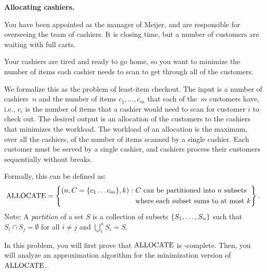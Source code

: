 \documentclass[11pt,addpoints,answers]{exam}
\begin{document}
\begin{questions}
\pagebreak
  \question \textbf{Allocating cashiers.} 

    You have been appointed as the manager of Meijer, and are responsible for overseeing the team of cashiers. It is closing time, but a number of customers are waiting with full carts. 

    Your cashiers are tired and ready to go home, so you want to minimize the number of items each cashier needs to scan to get through all of the customers. 
    
    We formalize this as the problem of least-item checkout.
    The input is a number of cashiers~$n$ and the number of items $c_{1}, \ldots, c_{m}$ that each of the~$m$ customers have, i.e., $c_{i}$ is the number of items that a cashier would need to scan for customer $i$ to check out.
    The desired output is an allocation of the customers to the cashiers that minimizes the workload.
    The workload of an allocation is the maximum, over all the cashiers, of the number of items scanned by a single cashier.
    Each customer must be served by a single cashier, and cashiers process their customers sequentially without breaks.
    
\newcommand{\Allocate}{\cproblem{ALLOCATE}}
Formally, this can be defined as:
\[
    \Allocate = \left\{
    \begin{aligned}
    (n, C=\set{c_1\ldots c_m}, k) :~ &\text{$C$ can be partitioned into $n$ subsets}\\
    &\text{where each subset sums to at most $k$}
    \end{aligned}
    \right\}.
\]
Note: A \emph{partition} of a set $S$ is a collection of subsets $\{S_1, \ldots, S_n\}$ such that $S_i \cap S_j = \emptyset$ for all $i \neq j$ and $\bigcup_i^n S_i = S$.

In this problem, you will first prove that $\Allocate$ is \NP-complete. Then, you will analyze an approximation algorithm for the minimization version of $\Allocate$.

\end{questions}
\end{document}
